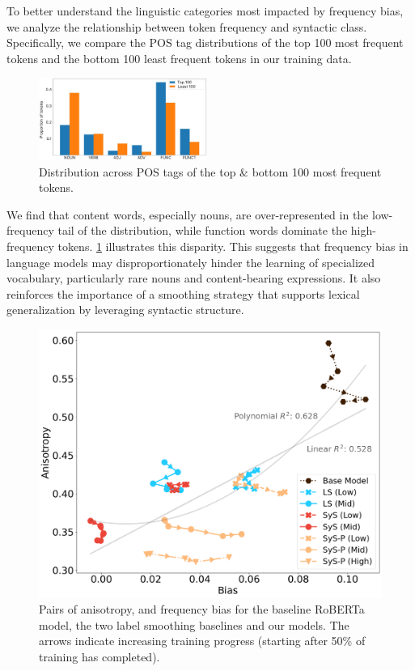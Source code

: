 To better understand the linguistic categories most impacted by frequency bias, we analyze the relationship between token frequency and syntactic class. Specifically, we compare the POS tag distributions of the top 100 most frequent tokens and the bottom 100 least frequent tokens in our training data. 

\begin{figure}
    \centering
    \includegraphics[width=0.49\textwidth]{chapters/syntatic-smoothing/figures/top_versus_bottom_pos_dist.pdf}
    \caption{Distribution across POS tags of the top \& bottom 100 most frequent tokens.}
    \label{fig:top-100-pos-dist}
\end{figure}


We find that content words, especially nouns, are over-represented in the low-frequency tail of the distribution, while function words dominate the high-frequency tokens. \cref{fig:top-100-pos-dist} illustrates this disparity. This suggests that frequency bias in language models may disproportionately hinder the learning of specialized vocabulary, particularly rare nouns and content-bearing expressions. It also reinforces the importance of a smoothing strategy that supports lexical generalization by leveraging syntactic structure.


\begin{figure}[ht!]
    \centering
    \includegraphics[width=0.75\linewidth]{chapters/syntatic-smoothing/figures/bias-vs-anisotropy.png}
    \caption{Pairs of anisotropy, and frequency bias for the baseline RoBERTa model, the two label smoothing baselines and our \smoothing models. The arrows indicate increasing training progress (starting after 50\% of training has completed).}
    \label{fig:bias-anisotropy-correlation}
\end{figure}

